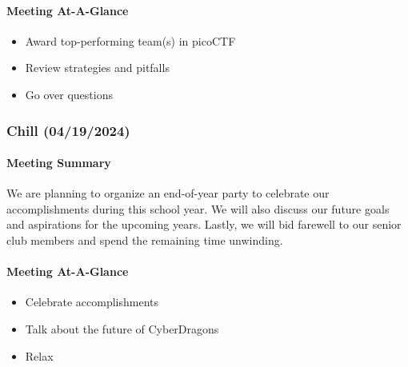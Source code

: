 \documentclass[
  letterpaper,
  DIV=11,
  numbers=noendperiod]{scrartcl}
\let\oldparagraph\paragraph
\renewcommand{\paragraph}[1]{\oldparagraph{#1}\mbox{}}
\providecommand{\tightlist}{%
  \setlength{\itemsep}{0pt}\setlength{\parskip}{0pt}}\usepackage{longtable,booktabs,array}
\begin{document}
\hypertarget{meeting-at-a-glance-19}{%
\paragraph{Meeting At-A-Glance}\label{meeting-at-a-glance-19}}

\begin{itemize}
\tightlist
\item
  Award top-performing team(s) in picoCTF
\item
  Review strategies and pitfalls
\item
  Go over questions
\end{itemize}

\hypertarget{chill-04192024}{%
\subsubsection{Chill (04/19/2024)}\label{chill-04192024}}

\hypertarget{meeting-summary-20}{%
\paragraph{Meeting Summary}\label{meeting-summary-20}}

We are planning to organize an end-of-year party to celebrate our
accomplishments during this school year. We will also discuss our future
goals and aspirations for the upcoming years. Lastly, we will bid
farewell to our senior club members and spend the remaining time
unwinding.

\hypertarget{meeting-at-a-glance-20}{%
\paragraph{Meeting At-A-Glance}\label{meeting-at-a-glance-20}}

\begin{itemize}
\tightlist
\item
  Celebrate accomplishments
\item
  Talk about the future of CyberDragons
\item
  Relax
\end{itemize}
\end{document}
